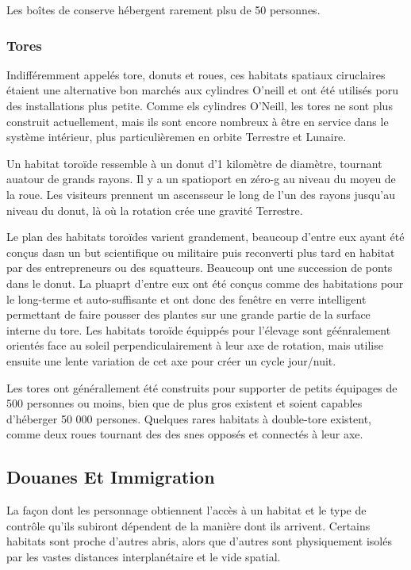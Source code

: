 Les boîtes de conserve hébergent rarement plsu de 50 personnes. 

\subsubsection{Tores} 

Indifféremment appelés tore, donuts et roues, ces habitats spatiaux ciruclaires étaient une alternative bon marchés aux cylindres O'neill et ont été utilisés poru des installations plus petite. Comme els cylindres O'Neill, les tores ne sont plus construit actuellement, mais ils sont encore nombreux à être en service dans le système intérieur, plus particulièremen en orbite Terrestre et Lunaire. 

Un habitat toroïde ressemble à un donut d'1 kilomètre de diamètre, tournant auatour de grands rayons. Il y a un spatioport en zéro-g au niveau du moyeu de la roue. Les visiteurs prennent un ascensseur le long de l'un des rayons jusqu'au niveau du donut, là où la rotation crée une gravité Terrestre. 

Le plan des habitats toroïdes varient grandement, beaucoup d'entre eux ayant été conçus dasn un but scientifique ou militaire puis reconverti plus tard en habitat par des entrepreneurs ou des squatteurs. Beaucoup ont une succession de ponts dans le donut. La pluaprt d'entre eux ont été conçus comme des habitations pour le long-terme et auto-suffisante et ont donc des fenêtre en verre intelligent permettant de faire pousser des plantes sur une grande partie de la surface interne du tore. Les habitats toroïde équippés pour l'élevage sont géénralement orientés face au soleil perpendiculairement à leur axe de rotation, mais utilise ensuite une lente variation de cet axe pour créer un cycle jour/nuit. 

Les tores ont générallement été construits pour supporter de petits équipages de 500 personnes ou moins, bien que de plus gros existent et soient capables d'héberger 50 000 persones. Quelques rares habitats à double-tore existent, comme deux roues tournant des des snes opposés et connectés à leur axe. 

\subsection{Douanes Et Immigration} 

La façon dont les personnage obtiennent l'accès à un habitat et le type de contrôle qu'ils subiront dépendent de la manière dont ils arrivent. Certains habitats sont proche d'autres abris, alors que d'autres sont physiquement isolés par les vastes distances interplanétaire et le vide spatial. 

